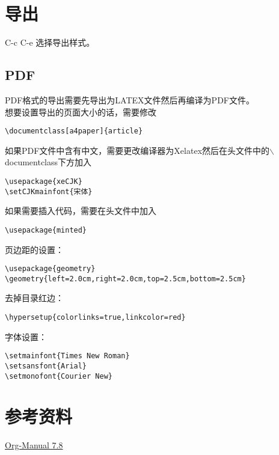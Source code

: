 \documentclass[11pt]{article}
\begin{document}
\section{导出}
\label{sec-3}

C-c C-e 选择导出样式。

\subsection{PDF}
\label{sec-3-1}

PDF格式的导出需要先导出为LATEX文件然后再编译为PDF文件。\\
想要设置导出的页面大小的话，需要修改
\begin{verbatim}
\documentclass[a4paper]{article}
\end{verbatim}
如果PDF文件中含有中文，需要更改编译器为Xelatex然后在头文件中的$\backslash$documentclass下方加入\\
\begin{verbatim}
\usepackage{xeCJK}
\setCJKmainfont{宋体}
\end{verbatim}
如果需要插入代码，需要在头文件中加入\\
\begin{verbatim}
\usepackage{minted}
\end{verbatim}
页边距的设置：
\begin{verbatim}
\usepackage{geometry}
\geometry{left=2.0cm,right=2.0cm,top=2.5cm,bottom=2.5cm}
\end{verbatim}
去掉目录红边：
\begin{verbatim}
\hypersetup{colorlinks=true,linkcolor=red}
\end{verbatim}
字体设置：
\begin{verbatim}
\setmainfont{Times New Roman}
\setsansfont{Arial}
\setmonofont{Courier New}
\end{verbatim}
\section{参考资料}
\label{sec-4}

\href{https://github.com/marboo/orgmode-cn/blob/master/org.org}{Org-Manual 7.8}
\end{document}
